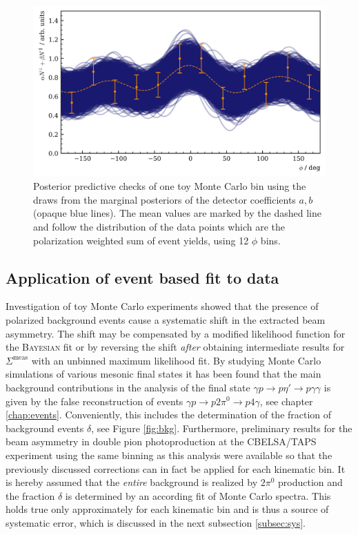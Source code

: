 \begin{figure}[htbp]
	\centering
	\includegraphics[width=\linewidth]{../bayes/etap_event_based_fit/plots/toyMC_eff_PPC.png}
	\caption{Posterior predictive checks of one toy Monte Carlo bin using the draws from the marginal posteriors of the detector coefficients $a,b$ (opaque blue lines). The mean values are marked by the dashed line and follow the distribution of the data points which are the polarization weighted sum of event yields, using 12 $\phi$ bins.}	
	\label{fig:toyMC_eff}
\end{figure}

\subsection{Application of event based fit to data}
Investigation of toy Monte Carlo experiments showed that the presence of polarized background events cause a systematic shift in the extracted beam asymmetry. The shift may be compensated by a modified likelihood function for the \textsc{Bayesian} fit or by reversing the shift \emph{after} obtaining intermediate results for $\Sigma^\text{meas}$ with an unbinned maximum likelihood fit. By studying Monte Carlo simulations of various mesonic final states it has been found that the main background contributions in the analysis of the final state $\gamma p \to p\eta'\to p\gamma\gamma$ is given by the false reconstruction of events $\gamma p \to p 2\pi^0\to p 4\gamma$, see chapter \ref{chap:events}. Conveniently, this includes the determination of the fraction of background events $\delta$, see Figure \ref{fig:bkg}. Furthermore, preliminary results for the beam asymmetry in double pion photoproduction at the CBELSA/TAPS experiment using the same binning as this analysis \cite{mahlbergphd} were available so that the previously discussed corrections can in fact be applied for each kinematic bin. It is hereby assumed that the \emph{entire} background is realized by $2\pi^0$ production and the fraction $\delta$ is determined by an according fit of Monte Carlo spectra. This holds true only approximately for each kinematic bin and is thus a source of systematic error, which is discussed in the next subsection \ref{subsec:sys}.

